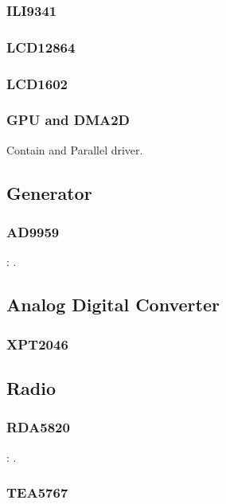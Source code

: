 \subsubsection{ILI9341}
\subsubsection{LCD12864}
\subsubsection{LCD1602}


\subsubsection{GPU and DMA2D}

Contain  and {Parallel} driver.

\subsection{Generator}

\subsubsection{AD9959}

: .

\subsection{Analog Digital Converter}

\subsubsection{XPT2046}

\subsection{Radio}

\subsubsection{RDA5820}

: .

\subsubsection{TEA5767}

